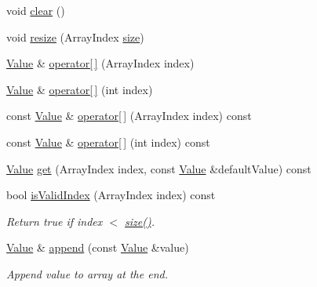 \begin{DoxyCompactItemize}
void \mbox{\hyperlink{class_json_1_1_value_a501a4d67e6c875255c2ecc03ccd2019b}{clear}} ()
\item 
void \mbox{\hyperlink{class_json_1_1_value_aa284353271ada427dbfa04a42f2be407}{resize}} (Array\+Index \mbox{\hyperlink{class_json_1_1_value_a0ec2808e1d7efa4e9fad938d6667be44}{size}})
\item 
\mbox{\hyperlink{class_json_1_1_value}{Value}} \& \mbox{\hyperlink{class_json_1_1_value_a9cca2c37d854443604b678f2236527ad}{operator\mbox{[}$\,$\mbox{]}}} (Array\+Index index)
\item 
\mbox{\hyperlink{class_json_1_1_value}{Value}} \& \mbox{\hyperlink{class_json_1_1_value_ad4b78dd032292ab1d91a3f89110b0d0e}{operator\mbox{[}$\,$\mbox{]}}} (int index)
\item 
const \mbox{\hyperlink{class_json_1_1_value}{Value}} \& \mbox{\hyperlink{class_json_1_1_value_a3b1aece4ef292926e2bdb42fed925508}{operator\mbox{[}$\,$\mbox{]}}} (Array\+Index index) const
\item 
const \mbox{\hyperlink{class_json_1_1_value}{Value}} \& \mbox{\hyperlink{class_json_1_1_value_a1a081ad448db7a14ef87e79ef28762d2}{operator\mbox{[}$\,$\mbox{]}}} (int index) const
\item 
\mbox{\hyperlink{class_json_1_1_value}{Value}} \mbox{\hyperlink{class_json_1_1_value_a034eb7bf85a44fa759bdaa232788ca66}{get}} (Array\+Index index, const \mbox{\hyperlink{class_json_1_1_value}{Value}} \&default\+Value) const
\item 
\mbox{\label{class_json_1_1_value_ac2928f174a6e081c1500c28c2d61ee93}} 
bool \mbox{\hyperlink{class_json_1_1_value_ac2928f174a6e081c1500c28c2d61ee93}{is\+Valid\+Index}} (Array\+Index index) const
\begin{DoxyCompactList}\small\item\em Return true if index $<$ \mbox{\hyperlink{class_json_1_1_value_a0ec2808e1d7efa4e9fad938d6667be44}{size()}}. \end{DoxyCompactList}\item 
\mbox{\hyperlink{class_json_1_1_value}{Value}} \& \mbox{\hyperlink{class_json_1_1_value_a3b7c0ef3bb1958cafdf10483e93ed711}{append}} (const \mbox{\hyperlink{class_json_1_1_value}{Value}} \&value)
\begin{DoxyCompactList}\small\item\em Append value to array at the end. \end{DoxyCompactList}\item 
\mbox{\label{class_json_1_1_value_aa744825e8edd61f538fa7e718f876dcc}} 

\end{DoxyCompactItemize}
